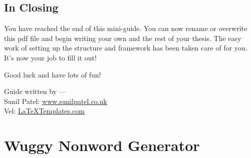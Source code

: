 \documentclass[
12pt, %
english, %
doublespacing, %
nolistspacing, %
liststotoc, %
headsepline, %
chapterinoneline, %
openany, %
]{DoctoralThesis}\usepackage[]{graphicx}\usepackage[]{color}
\begin{document}
\section{In Closing}

You have reached the end of this mini-guide. You can now rename or overwrite this pdf file and begin writing your own  and the rest of your thesis. The easy work of setting up the structure and framework has been taken care of for you. It's now your job to fill it out!

Good luck and have lots of fun!

\begin{flushright}
Guide written by ---\\
Sunil Patel: \href{http://www.sunilpatel.co.uk}{www.sunilpatel.co.uk}\\
Vel: \href{http://www.LaTeXTemplates.com}{LaTeXTemplates.com}
\end{flushright}


%
%

\renewcommand\thechapter{}

\appendix %







\chapter{Wuggy Nonword Generator} %
\end{document}
